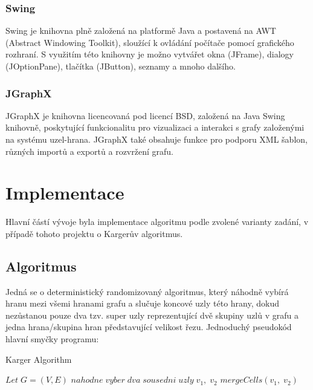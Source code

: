 \documentclass[../projekt.tex]{subfiles}
\begin{document}
\subsubsection{Swing} 

Swing \cite{swing} je knihovna plně založená na platformě Java a postavená na
AWT (Abstract Windowing Toolkit), sloužící k ovládání počítače pomocí
grafického rozhraní. S využitím této knihovny je možno vytvářet okna (JFrame), 
dialogy (JOptionPane), tlačítka (JButton), seznamy  a mnoho dalšího.


\subsubsection{JGraphX} 

JGraphX \cite{jgraphx} je knihovna licencovaná pod licencí BSD,
založená na Java Swing knihovně, poskytující funkcionalitu
pro vizualizaci a interakci s grafy založenými na systému uzel-hrana.
JGraphX také obsahuje funkce pro podporu XML šablon, různých
importů a exportů a rozvržení grafu.


\section{Implementace}

Hlavní částí vývoje byla implementace algoritmu podle zvolené varianty zadání,
v případě tohoto projektu o Kargerův algoritmus. 

\subsection{Algoritmus}

Jedná se o deterministický randomizovaný algoritmus, který náhodně vybírá hranu
mezi všemi hranami grafu a slučuje koncové uzly této hrany, dokud nezůstanou pouze
dva tzv. super uzly \cite{karger} reprezentující dvě skupiny uzlů v grafu a jedna
hrana/skupina hran představující velikost řezu. Jednoduchý pseudokód hlavní smyčky programu:


\begin{algorithm}
\caption{Karger Algorithm}\label{euclid}
\begin{algorithmic}[1]
\State $Let \; G = (V, E)$
\State $nahodne \; vyber \; dva \; sousedni \; uzly \; v_1, \; v_2$
\State $mergeCells(v_1, \; v_2)$
\EndWhile
\end{algorithmic}
\end{algorithm}
\end{document}
